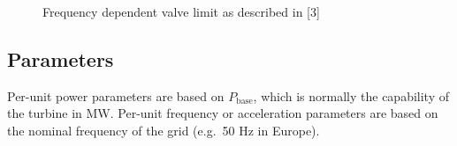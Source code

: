 \documentclass[
  a4paper,
  DIV=11,
  numbers=noendperiod]{scrartcl}
\begin{document}
\begin{figure}


\caption{\label{fig-frequencyDependentLimit}Frequency dependent valve
limit as described in {[}3{]}}

\end{figure}%

\subsection{Parameters}\label{parameters}

Per-unit power parameters are based on \(P_\mathrm{base}\), which is
normally the capability of the turbine in MW. Per-unit frequency or
acceleration parameters are based on the nominal frequency of the grid
(e.g.~50 Hz in Europe).
\end{document}
